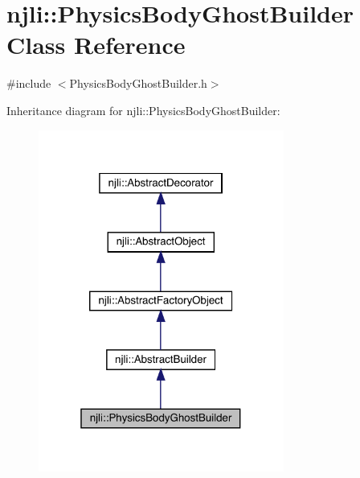 \hypertarget{classnjli_1_1_physics_body_ghost_builder}{}\section{njli\+:\+:Physics\+Body\+Ghost\+Builder Class Reference}
\label{classnjli_1_1_physics_body_ghost_builder}


{\ttfamily \#include $<$Physics\+Body\+Ghost\+Builder.\+h$>$}



Inheritance diagram for njli\+:\+:Physics\+Body\+Ghost\+Builder\+:\nopagebreak
\begin{figure}[H]
\begin{center}
\leavevmode
\includegraphics[width=229pt]{classnjli_1_1_physics_body_ghost_builder__inherit__graph}
\end{center}
\end{figure}


